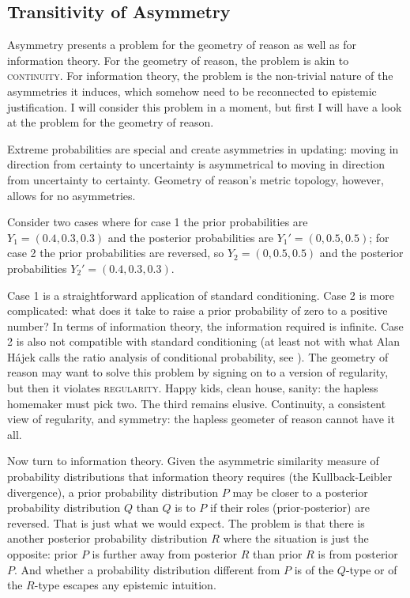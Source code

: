 \documentclass[smallextended]{svjour3}       %
\begin{document}
\subsection{Transitivity of Asymmetry}
\label{subsec:Asymmetry}

Asymmetry presents a problem for the geometry of reason as well as for
information theory. For the geometry of reason, the problem is akin to
\textsc{continuity}. For information theory, the problem is the
non-trivial nature of the asymmetries it induces, which somehow need
to be reconnected to epistemic justification. I will consider this
problem in a moment, but first I will have a look at the problem for
the geometry of reason.

Extreme probabilities are special and create asymmetries in updating:
moving in direction from certainty to uncertainty is asymmetrical to
moving in direction from uncertainty to certainty. Geometry of
reason's metric topology, however, allows for no asymmetries.

\begin{quotex}
  \label{ex:extreme} Consider two cases
  where for case 1 the prior probabilities are $Y_{1}=(0.4,0.3,0.3)$
  and the posterior probabilities are $Y_{1}'=(0,0.5,0.5)$; for case 2
  the prior probabilities are reversed, so $Y_{2}=(0,0.5,0.5)$ and the
  posterior probabilities $Y_{2}'=(0.4,0.3,0.3)$.
\end{quotex}

Case 1 is a straightforward application of standard conditioning. Case
2 is more complicated: what does it take to raise a prior probability
of zero to a positive number? In terms of information theory, the
information required is infinite. Case 2 is also not compatible with
standard conditioning (at least not with what Alan H{\'a}jek calls the
ratio analysis of conditional probability, see ).
The geometry of reason may want to solve this problem by signing on to
a version of regularity, but then it violates \textsc{regularity}.
Happy kids, clean house, sanity: the hapless homemaker must pick two.
The third remains elusive. Continuity, a consistent view of
regularity, and symmetry: the hapless geometer of reason cannot have
it all.

Now turn to information theory. Given the asymmetric similarity
measure of probability distributions that information theory requires
(the Kullback-Leibler divergence), a prior probability distribution
$P$ may be closer to a posterior probability distribution $Q$ than $Q$
is to $P$ if their roles (prior-posterior) are reversed. That is just
what we would expect. The problem is that there is another posterior
probability distribution $R$ where the situation is just the opposite:
prior $P$ is further away from posterior $R$ than prior $R$ is from
posterior $P$. And whether a probability distribution different from
$P$ is of the $Q$-type or of the $R$-type escapes any epistemic
intuition.
\end{document}
